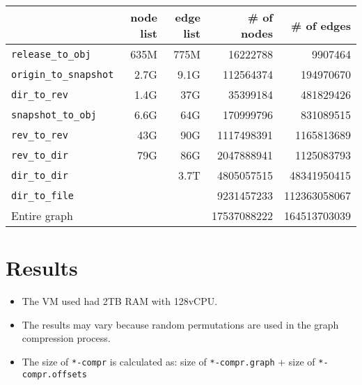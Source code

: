 \documentclass[11pt,a4paper]{article}
\begin{document}
\begin{center}
    \begin{tabular}{@{} l *4r @{}}
        \toprule
        \multicolumn{1}{c}{} &
            \textbf{node list} & \textbf{edge list} &
            \textbf{\# of nodes} & \textbf{\# of edges} \\
        \midrule
        \texttt{release\_to\_obj}
            & 635M & 775M & \num{16222788} & \num{9907464} \\
        \texttt{origin\_to\_snapshot}
            & 2.7G & 9.1G & \num{112564374} & \num{194970670} \\
        \texttt{dir\_to\_rev}
            & 1.4G & 37G & \num{35399184} & \num{481829426} \\
        \texttt{snapshot\_to\_obj}
            & 6.6G & 64G & \num{170999796} & \num{831089515} \\
        \texttt{rev\_to\_rev}
            & 43G & 90G & \num{1117498391} & \num{1165813689} \\
        \texttt{rev\_to\_dir}
            & 79G & 86G & \num{2047888941} & \num{1125083793} \\
        \texttt{dir\_to\_dir}
            & & 3.7T & \num{4805057515} & \num{48341950415} \\
        \texttt{dir\_to\_file}
            & & & \num{9231457233} & \num{112363058067} \\
        \midrule
        Entire graph & & & \num{17537088222} & \num{164513703039} \\
        \bottomrule
    \end{tabular}
\end{center}

\section{Results}

\begin{itemize}
    \item The VM used had 2TB RAM with 128vCPU.
    \item The results may vary because random permutations are used in the graph
        compression process.
    \item The size of \texttt{*-compr} is calculated as: size of
        \texttt{*-compr.graph} + size of
        \texttt{*-compr.offsets}
\end{itemize}
\end{document}
